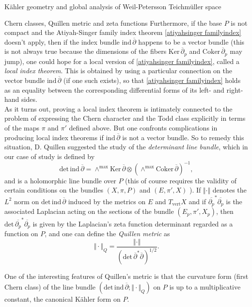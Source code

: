 \documentclass[12pt]{amsart}
\theoremstyle{plain}
\theoremstyle{definition}
\theoremstyle{remark}
\numberwithin{equation}{section} %
\numberwithin{figure}{section} %
\begin{document}
\begin{section}{K\"ahler geometry and global analysis of Weil-Petersson Teichm\"uller space}
\begin{subsection}{Chern classes, Quillen metric and zeta functions}
 Furthermore, if the base $P$ is not compact and the Atiyah-Singer family index theorem \eqref{atiyahsinger familyindex} doesn't apply, then if the index bundle $\mathrm{ind}\,\overline{\partial}$ happens to be a vector bundle (this is not always true because the dimensions of the fibers $\mathrm{Ker}\,\overline{\partial}_p$ and $\mathrm{Coker}\,\overline{\partial}_p$ may jump), one could hope for a local version of \eqref{atiyahsinger familyindex}, called a \emph{local index theorem}.   This is obtained by using a particular connection on the vector bundle $\mathrm{ind}\,\overline{\partial}$ (if one such exists), so that \eqref{atiyahsinger familyindex} holds as an equality between the corresponding differential forms of its left- and right-hand sides.\\

 As it turns out, proving a local index theorem is intimately connected to the problem of expressing the Chern character and the Todd class explicitly in terms of the maps $\pi$ and $\pi'$ defined above. But one confronts complications in producing local index theorems if $\mathrm{ind}\,\overline{\partial}$  is not a vector bundle. So to remedy this situation, D. Quillen \cite{Quillen} suggested the study of the \emph{determinant line bundle}, which in our case of study is defined by
$$\mathrm{det\, ind }\,\overline{\partial} = \wedge^{\mathrm{max}}\mathrm{Ker}\,\overline{\partial}\otimes (\wedge^{\mathrm{max}}\mathrm{Coker}\,\overline{\partial})^{-1},$$
and is a holomorphic line bundle over $P$ (this of course requires the validity of certain conditions on the bundles $(X, \pi, P )$ and $(E, \pi', X )$ ). If $\Vert\cdot\Vert$ denotes the $L^2$ norm on $\mathrm{det\, ind }\,\overline{\partial}$ induced by the metrics on $E$ and $T_{\mathrm{vert}}X$ and if $\overline{\partial_p}^{*}\overline{\partial_p}$ is the associated Laplacian acting on the sections of the bundle $(E_p, \pi', X_p )$, then $\mathrm{det}\,\overline{\partial_p}^{*}\overline{\partial_p}$ is given by the Laplacian's zeta function determinant regarded as a function on $P$, and one can define the \emph{Quillen metric} as
$$\Vert\cdot\Vert_{Q}= \frac{\Vert\cdot\Vert}{(\mathrm{det}\,\overline{\partial}^{*}\overline{\partial})^{1/2}}.$$

One of the interesting features of Quillen's metric is that the curvature form (first Chern class) of the line bundle $(\mathrm{det\, ind }\,\overline{\partial} ;\Vert\cdot\Vert_{Q})$ on $P$ is up to a multiplicative constant, the canonical K\"ahler form on $P$.


\end{subsection}
\end{section}
\end{document}
